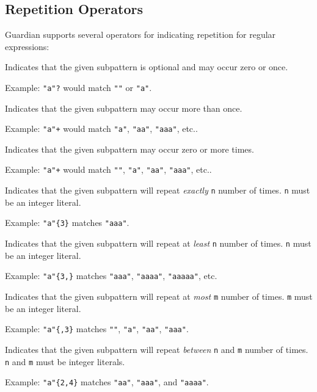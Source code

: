 
\subsection{Repetition Operators}
{
	Guardian supports several operators for indicating
	repetition for regular expressions:
	
	\begin{itemize}
	{
		\item[\texttt{(...)?}] Indicates that the given subpattern is optional
			and may occur zero or once. 
			
			Example: \texttt{"a"?} would match \texttt{""} or \texttt{"a"}.
		\item[\texttt{(...)+}] Indicates that the given subpattern may occur
			more than once.
			
			Example: \texttt{"a"+} would match \texttt{"a"},
				\texttt{"aa"}, \texttt{"aaa"}, etc..
		\item[\texttt{(...)*}] Indicates that the given subpattern may occur
			zero or more times.
			
			Example: \texttt{"a"+} would match \texttt{""}, \texttt{"a"},
				\texttt{"aa"}, \texttt{"aaa"}, etc..
		\item[\texttt{(...)\{n\}}] Indicates that the given subpattern will
			repeat \textit{exactly} \texttt{n} number of times.
			\texttt{n} must be an integer
			literal.
			
			Example: \texttt{"a"\{3\}} matches \texttt{"aaa"}.
		\item[\texttt{(...)\{n,\}}] Indicates that the given subpattern will
			repeat at \textit{least} \texttt{n} number of
			times. \texttt{n} must be an integer
			literal.
			
			Example: \texttt{"a"\{3,\}} matches \texttt{"aaa"}, \texttt{"aaaa"},
			\texttt{"aaaaa"}, etc.
		\item[\texttt{(...)\{,m\}}] Indicates that the given subpattern will
			repeat at \textit{most} \texttt{m} number of
			times. \texttt{m} must be an integer literal.
			
			Example: \texttt{"a"\{,3\}} matches \texttt{""}, \texttt{"a"},
			\texttt{"aa"}, \texttt{"aaa"}.
		\item[\texttt{(...)\{n,m\}}] Indicates that the given subpattern will
			repeat \textit{between} \texttt{n} and \texttt{m} number of
			times. \texttt{n} and \texttt{m} must be integer literals.
			
			Example: \texttt{"a"\{2,4\}} matches \texttt{"aa"}, \texttt{"aaa"},
			and \texttt{"aaaa"}.
	}
	\end{itemize}
}
